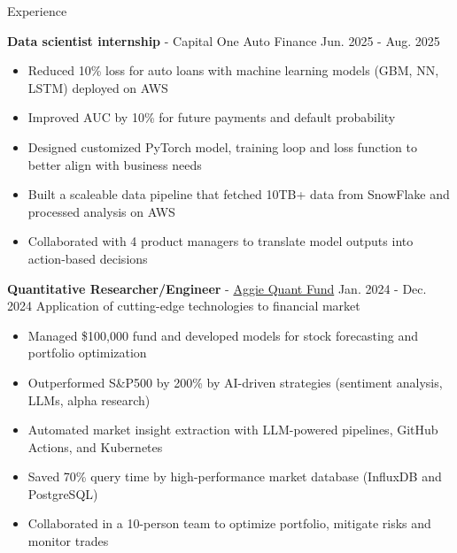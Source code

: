 \documentclass{resume}
\begin{document}
\begin{rSection}{Experience}
    \vspace{-1em}
    \item \textbf{Data scientist internship} - Capital One Auto Finance \hfill Jun. 2025 - Aug. 2025
        \begin{itemize}
        \item Reduced 10\% loss for auto loans with machine learning models (GBM, NN, LSTM) deployed on AWS
        \item Improved AUC by 10\% for future payments and default probability
        \item Designed customized PyTorch model, training loop and loss function to better align with business needs
        \item Built a scaleable data pipeline that fetched 10TB+ data from SnowFlake and processed analysis on AWS
        \item Collaborated with 4 product managers to translate model outputs into action-based decisions
        \end{itemize}

    \item \textbf{Quantitative Researcher/Engineer} - \href{https://www.linkedin.com/company/aggieqf}{Aggie Quant Fund} \hfill Jan. 2024 - Dec. 2024
        \newline\hspace*{0.5em} {\normalsize Application of cutting-edge technologies to financial market}
        \begin{itemize}
        \item Managed \$100,000 fund and developed models for stock forecasting and portfolio optimization
        \item Outperformed S\&P500 by 200\% by AI-driven strategies (sentiment analysis, LLMs, alpha research)
        \item Automated market insight extraction with LLM-powered pipelines, GitHub Actions, and Kubernetes
        \item Saved 70\% query time by high-performance market database (InfluxDB and PostgreSQL)
        \item Collaborated in a 10-person team to optimize portfolio, mitigate risks and monitor trades
        \end{itemize}


\end{rSection}
\end{document}
